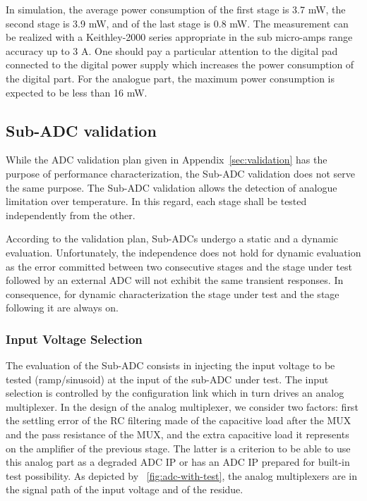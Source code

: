 In simulation, the average power consumption of the first stage is 3.7 mW, the second stage is 3.9 mW, and of the last stage is 0.8 mW. The measurement can be realized with a Keithley-2000 series appropriate in the sub micro-amps range accuracy up to 3 A. One should pay a particular attention to the digital pad connected to the digital power supply which increases the power consumption of the digital part. For the analogue part, the maximum power consumption is expected to be less than 16 mW.

\subsection{Sub-ADC validation}
While the ADC validation plan given in Appendix~\ref{sec:validation} has the purpose of performance characterization, the Sub-ADC validation does not serve the same purpose. The Sub-ADC validation allows the detection of analogue limitation over temperature. In this regard, each stage shall be tested independently from the other.

According to the validation plan, Sub-ADCs undergo a static and a dynamic evaluation. Unfortunately, the independence does not hold for dynamic evaluation as the error committed between two consecutive stages and the stage under test followed by an external ADC will not exhibit the same transient responses. In consequence, for dynamic characterization the stage under test and the stage following it are always on.

    \subsubsection{Input Voltage Selection}
The evaluation of the Sub-ADC consists in injecting the input voltage to be tested (ramp/sinusoid) at the input of the sub-ADC under test. The input selection is controlled by the configuration link which in turn drives an analog multiplexer. In the design of the analog multiplexer, we consider two factors: first the settling error of the RC filtering made of the capacitive load after the MUX and the pass resistance of the MUX, and the extra capacitive load it represents on the amplifier of the previous stage. The latter is a criterion to be able to use this analog part as a degraded ADC IP or has an ADC IP prepared for built-in test possibility. As depicted by \figurename~\ref{fig:adc-with-test}, the analog multiplexers are in the signal path of the input voltage and of the residue.

